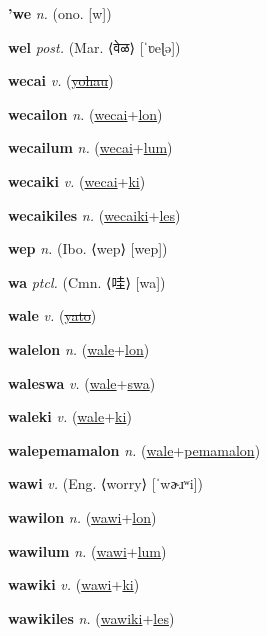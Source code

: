 \textbf{\hypertarget{'we}{'we}} \textit{n.} (ono. [w])


\textbf{\hypertarget{wel}{wel}} \textit{post.} (Mar. ⟨{\devanagari{}वेळ}⟩ [ˈʋeɭə])


\textbf{\hypertarget{wecai}{wecai}} \textit{v.} (\hyperlink{yohau}{\sout{yohau}})


\textbf{\hypertarget{wecailon}{wecailon}} \textit{n.} (\hyperlink{wecai}{wecai}+\allowbreak \hyperlink{lon}{lon})


\textbf{\hypertarget{wecailum}{wecailum}} \textit{n.} (\hyperlink{wecai}{wecai}+\allowbreak \hyperlink{lum}{lum})


\textbf{\hypertarget{wecaiki}{wecaiki}} \textit{v.} (\hyperlink{wecai}{wecai}+\allowbreak \hyperlink{ki}{ki})


\textbf{\hypertarget{wecaikiles}{wecaikiles}} \textit{n.} (\hyperlink{wecaiki}{wecaiki}+\allowbreak \hyperlink{les}{les})


\textbf{\hypertarget{wep}{wep}} \textit{n.} (Ibo. ⟨wep⟩ [wep])


\textbf{\hypertarget{wa}{wa}} \textit{ptcl.} (Cmn. ⟨{\chinese{}哇}⟩ [wa])


\textbf{\hypertarget{wale}{wale}} \textit{v.} (\hyperlink{yato}{\sout{yato}})


\textbf{\hypertarget{walelon}{walelon}} \textit{n.} (\hyperlink{wale}{wale}+\allowbreak \hyperlink{lon}{lon})


\textbf{\hypertarget{waleswa}{waleswa}} \textit{v.} (\hyperlink{wale}{wale}+\allowbreak \hyperlink{swa}{swa})


\textbf{\hypertarget{waleki}{waleki}} \textit{v.} (\hyperlink{wale}{wale}+\allowbreak \hyperlink{ki}{ki})


\textbf{\hypertarget{walepemamalon}{walepemamalon}} \textit{n.} (\hyperlink{wale}{wale}+\allowbreak \hyperlink{pemamalon}{pemamalon})


\textbf{\hypertarget{wawi}{wawi}} \textit{v.} (Eng. ⟨worry⟩ [ˈwɚɹʷi])


\textbf{\hypertarget{wawilon}{wawilon}} \textit{n.} (\hyperlink{wawi}{wawi}+\allowbreak \hyperlink{lon}{lon})


\textbf{\hypertarget{wawilum}{wawilum}} \textit{n.} (\hyperlink{wawi}{wawi}+\allowbreak \hyperlink{lum}{lum})


\textbf{\hypertarget{wawiki}{wawiki}} \textit{v.} (\hyperlink{wawi}{wawi}+\allowbreak \hyperlink{ki}{ki})


\textbf{\hypertarget{wawikiles}{wawikiles}} \textit{n.} (\hyperlink{wawiki}{wawiki}+\allowbreak \hyperlink{les}{les})


